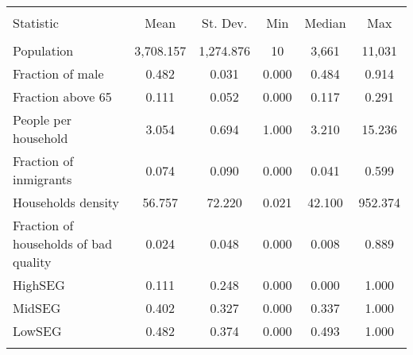 
\begin{tabular}{@{\extracolsep{-5pt}}lccccc} 
\\[-1.8ex]\hline 
\hline \\[-1.8ex] 
Statistic & \multicolumn{1}{c}{Mean} & \multicolumn{1}{c}{St. Dev.} & \multicolumn{1}{c}{Min} & \multicolumn{1}{c}{Median} & \multicolumn{1}{c}{Max} \\ 
\hline \\[-1.8ex] 
Population & 3,708.157 & 1,274.876 & 10 & 3,661 & 11,031 \\ 
Fraction of male & 0.482 & 0.031 & 0.000 & 0.484 & 0.914 \\ 
Fraction above 65 & 0.111 & 0.052 & 0.000 & 0.117 & 0.291 \\ 
People per household & 3.054 & 0.694 & 1.000 & 3.210 & 15.236 \\ 
Fraction of inmigrants & 0.074 & 0.090 & 0.000 & 0.041 & 0.599 \\ 
Households density & 56.757 & 72.220 & 0.021 & 42.100 & 952.374 \\ 
Fraction of households of bad quality & 0.024 & 0.048 & 0.000 & 0.008 & 0.889 \\ 
HighSEG & 0.111 & 0.248 & 0.000 & 0.000 & 1.000 \\ 
MidSEG & 0.402 & 0.327 & 0.000 & 0.337 & 1.000 \\ 
LowSEG & 0.482 & 0.374 & 0.000 & 0.493 & 1.000 \\ 
\hline \\[-1.8ex] 
\end{tabular} 

